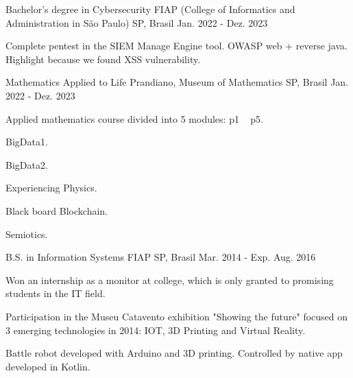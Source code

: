 

\begin{cventries}

  \cventry
    {Bachelor's degree in Cybersecurity} %
    {FIAP (College of Informatics and Administration in São Paulo)} %
    {SP, Brasil} %
    {Jan. 2022 - Dez. 2023} %
    {
      \begin{cvitems} %
        \item {Complete pentest in the SIEM Manage Engine tool. OWASP web + reverse java. Highlight because we found XSS vulnerability.}
      \end{cvitems}
    }
	\cventry
	{Mathematics Applied to Life} %
	{Prandiano, Museum of Mathematics} %
	{SP, Brasil} %
	{Jan. 2022 - Dez. 2023} %
	{
		\begin{cvitems} %
			\item {Applied mathematics course divided into 5 modules: p1 ~ p5. }
			\item {BigData1.}
			\item {BigData2.}
			\item {Experiencing Physics.}
			\item {Black board Blockchain.}
			\item {Semiotics.}
		\end{cvitems}
	}
  \cventry
	{B.S. in Information Systems} %
	{FIAP} %
	{SP, Brasil} %
	{Mar. 2014 - Exp. Aug. 2016} %
	{
		\begin{cvitems} %
			\item {Won an internship as a monitor at college, which is only granted to promising students in the IT field. }
			\item {Participation in the Museu Catavento exhibition "Showing the future" focused on 3 emerging technologies in 2014: IOT, 3D Printing and Virtual Reality.}
			\item {Battle robot developed with Arduino and 3D printing. Controlled by native app developed in Kotlin.}
		\end{cvitems}
	}

\end{cventries}
